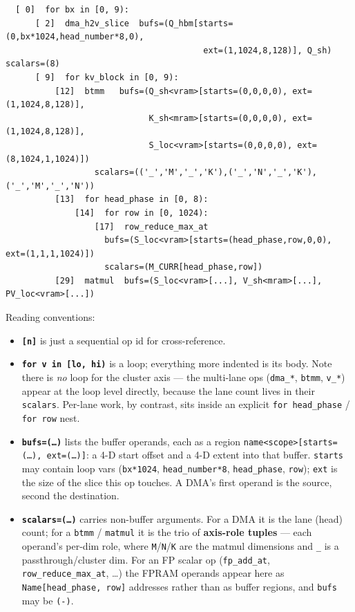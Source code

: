 \documentclass[
  10pt,
]{article}
\begin{document}
\begin{verbatim}
  [ 0]  for bx in [0, 9):
      [ 2]  dma_h2v_slice  bufs=(Q_hbm[starts=(0,bx*1024,head_number*8,0),
                                        ext=(1,1024,8,128)], Q_sh)  scalars=(8)
      [ 9]  for kv_block in [0, 9):
          [12]  btmm   bufs=(Q_sh<vram>[starts=(0,0,0,0), ext=(1,1024,8,128)],
                             K_sh<mram>[starts=(0,0,0,0), ext=(1,1024,8,128)],
                             S_loc<vram>[starts=(0,0,0,0), ext=(8,1024,1,1024)])
                  scalars=(('_','M','_','K'),('_','N','_','K'),('_','M','_','N'))
          [13]  for head_phase in [0, 8):
              [14]  for row in [0, 1024):
                  [17]  row_reduce_max_at
                    bufs=(S_loc<vram>[starts=(head_phase,row,0,0), ext=(1,1,1,1024)])
                    scalars=(M_CURR[head_phase,row])
          [29]  matmul  bufs=(S_loc<vram>[...], V_sh<mram>[...], PV_loc<vram>[...])
\end{verbatim}

Reading conventions:

\begin{itemize}
\item
  \textbf{\texttt{[n]}} is just a sequential op id for cross-reference.
\item
  \textbf{\texttt{for v in [lo, hi)}} is a loop; everything more indented
  is its body. Note there is \emph{no} loop for the cluster axis --- the
  multi-lane ops (\texttt{dma\_*}, \texttt{btmm}, \texttt{v\_*}) appear at
  the loop level directly, because the lane count lives in their
  \texttt{scalars}. Per-lane work, by contrast, sits inside an explicit
  \texttt{for head\_phase} / \texttt{for row} nest.
\item
  \textbf{\texttt{bufs=(\dots)}} lists the buffer operands, each as a
  region \texttt{name<scope>[starts=(\dots), ext=(\dots)]}: a 4-D start
  offset and a 4-D extent into that buffer. \texttt{starts} may contain
  loop vars (\texttt{bx*1024}, \texttt{head\_number*8},
  \texttt{head\_phase}, \texttt{row}); \texttt{ext} is the size of the
  slice this op touches. A DMA's first operand is the source, second the
  destination.
\item
  \textbf{\texttt{scalars=(\dots)}} carries non-buffer arguments. For a
  DMA it is the lane (head) count; for a \texttt{btmm} / \texttt{matmul}
  it is the trio of \textbf{axis-role tuples} --- each operand's per-dim
  role, where \texttt{M}/\texttt{N}/\texttt{K} are the matmul dimensions
  and \texttt{\_} is a passthrough/cluster dim. For an FP scalar op
  (\texttt{fp\_add\_at}, \texttt{row\_reduce\_max\_at}, \dots) the FPRAM
  operands appear here as \texttt{Name[head\_phase, row]} addresses
  rather than as buffer regions, and \texttt{bufs} may be \texttt{(-)}.
\end{itemize}
\end{document}
